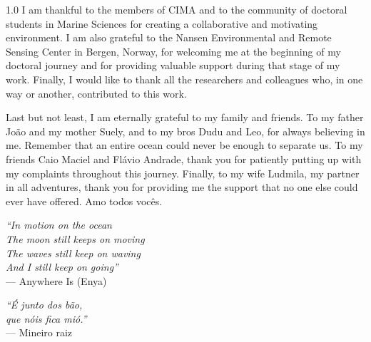 \documentclass{auxfiles/ualgphdcls}
\begin{document}
\begin{spacing}{1.0}
I am thankful to the members of CIMA and to the community of doctoral students in Marine Sciences for creating a collaborative and motivating environment. I am also grateful to the Nansen Environmental and Remote Sensing Center in Bergen, Norway, for welcoming me at the beginning of my doctoral journey and for providing valuable support during that stage of my work. Finally, I would like to thank all the researchers and colleagues who, in one way or another, contributed to this work.

Last but not least, I am eternally grateful to my family and friends. To my father João and my mother Suely, and to my bros Dudu and Leo, for always believing in me. Remember that an entire ocean could never be enough to separate us. To my friends Caio Maciel and Flávio Andrade, thank you for patiently putting up with my complaints throughout this journey. Finally, to my wife Ludmila, my partner in all adventures, thank you for providing me the support that no one else could ever have offered. Amo todos vocês.
\end{spacing}
\newpage

\vspace*{\fill}
\begin{flushright}
\textit{``In motion on the ocean\\The moon still keeps on moving\\The waves still keep on waving\\And I still keep on going''}\\--- Anywhere Is (Enya)
\vspace{8mm}

\textit{``É junto dos bão,\\que nóis fica mió.''}\\--- Mineiro raiz
\end{flushright}

\frontmatter
\pagestyle{fancy}

\end{document}
